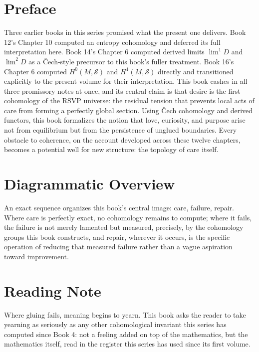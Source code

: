 \chapter*{Preface}

Three earlier books in this series promised what the present one delivers. Book 12's Chapter 10 computed an entropy cohomology and deferred its full interpretation here. Book 14's Chapter 6 computed derived limits $\lim^1 D$ and $\lim^2 D$ as a Čech-style precursor to this book's fuller treatment. Book 16's Chapter 6 computed $H^0(M,\mathcal{S})$ and $H^1(M,\mathcal{S})$ directly and transitioned explicitly to the present volume for their interpretation. This book cashes in all three promissory notes at once, and its central claim is that desire is the first cohomology of the RSVP universe: the residual tension that prevents local acts of care from forming a perfectly global section. Using Čech cohomology and derived functors, this book formalizes the notion that love, curiosity, and purpose arise not from equilibrium but from the persistence of unglued boundaries. Every obstacle to coherence, on the account developed across these twelve chapters, becomes a potential well for new structure: the topology of care itself.

\chapter*{Diagrammatic Overview}

An exact sequence organizes this book's central image: care, failure, repair. Where care is perfectly exact, no cohomology remains to compute; where it fails, the failure is not merely lamented but measured, precisely, by the cohomology groups this book constructs, and repair, wherever it occurs, is the specific operation of reducing that measured failure rather than a vague aspiration toward improvement.

\chapter*{Reading Note}

Where gluing fails, meaning begins to yearn. This book asks the reader to take yearning as seriously as any other cohomological invariant this series has computed since Book 4: not a feeling added on top of the mathematics, but the mathematics itself, read in the register this series has used since its first volume.


